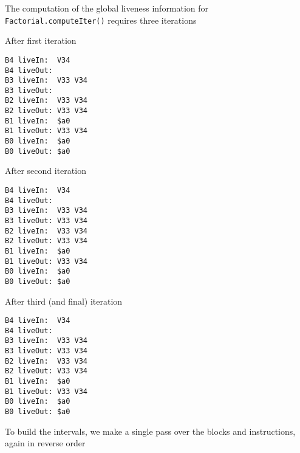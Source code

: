 \documentclass[8pt,a4paper,compress]{beamer}
\begin{document}
\begin{frame}[fragile]
\pause

The computation of the global liveness information for \lstinline{Factorial.computeIter()} requires three iterations

\pause
\bigskip

After first iteration
\begin{lstlisting}[language={},style=focusin]
B4 liveIn:  V34
B4 liveOut:
B3 liveIn:  V33 V34
B3 liveOut:
B2 liveIn:  V33 V34
B2 liveOut: V33 V34
B1 liveIn:  $a0                                                                 
B1 liveOut: V33 V34                                                             
B0 liveIn:  $a0
B0 liveOut: $a0
\end{lstlisting}

\pause

After second iteration
\begin{lstlisting}[language={},style=focusin]
B4 liveIn:  V34
B4 liveOut:
B3 liveIn:  V33 V34
B3 liveOut: V33 V34
B2 liveIn:  V33 V34
B2 liveOut: V33 V34
B1 liveIn:  $a0                                                                 
B1 liveOut: V33 V34                                                             
B0 liveIn:  $a0
B0 liveOut: $a0
\end{lstlisting}
\end{frame}

\begin{frame}[fragile]
\pause

After third (and final) iteration
\begin{lstlisting}[language={},style=focusin]
B4 liveIn:  V34
B4 liveOut:
B3 liveIn:  V33 V34
B3 liveOut: V33 V34
B2 liveIn:  V33 V34
B2 liveOut: V33 V34
B1 liveIn:  $a0
B1 liveOut: V33 V34
B0 liveIn:  $a0                                                                 
B0 liveOut: $a0
\end{lstlisting}

\pause
\bigskip

To build the intervals, we make a single pass over the blocks and instructions, again in reverse order
\end{frame}
\end{document}
